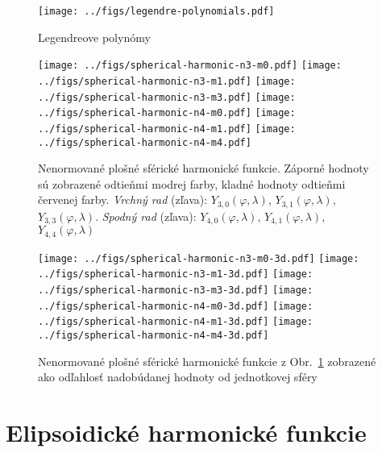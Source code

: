 \documentclass[a4paper, 12pt]{book}
\begin{document}
{

\begin{figure}[bt]
\centering
\texttt{[image: ../figs/legendre-polynomials.pdf]}
\caption{Legendreove polynómy}
\end{figure}




\begin{figure}[bt]
\centering
\texttt{[image: ../figs/spherical-harmonic-n3-m0.pdf]}
\texttt{[image: ../figs/spherical-harmonic-n3-m1.pdf]}
\texttt{[image: ../figs/spherical-harmonic-n3-m3.pdf]}
\texttt{[image: ../figs/spherical-harmonic-n4-m0.pdf]}
\texttt{[image: ../figs/spherical-harmonic-n4-m1.pdf]}
\texttt{[image: ../figs/spherical-harmonic-n4-m4.pdf]}
\caption{Nenormované plošné sférické harmonické funkcie.  Záporné hodnoty sú 
zobrazené odtieňmi modrej farby, kladné hodnoty odtieňmi červenej farby.  
\textit{Vrchný rad} (zľava): $Y_{3,0}(\varphi, \lambda)$, $Y_{3,1}(\varphi, 
\lambda)$, $Y_{3,3}(\varphi, \lambda)$.  \textit{Spodný rad} (zľava): 
$Y_{4,0}(\varphi, \lambda)$, $Y_{4,1}(\varphi, \lambda)$, $Y_{4,4}(\varphi, 
\lambda)$}
\label{fig:sh}
\end{figure}


\begin{figure}[bt]
\centering
\texttt{[image: ../figs/spherical-harmonic-n3-m0-3d.pdf]}
\texttt{[image: ../figs/spherical-harmonic-n3-m1-3d.pdf]}
\texttt{[image: ../figs/spherical-harmonic-n3-m3-3d.pdf]}
\texttt{[image: ../figs/spherical-harmonic-n4-m0-3d.pdf]}
\texttt{[image: ../figs/spherical-harmonic-n4-m1-3d.pdf]}
\texttt{[image: ../figs/spherical-harmonic-n4-m4-3d.pdf]}
\caption{Nenormované plošné sférické harmonické funkcie z Obr.~\ref{fig:sh} 
zobrazené ako odľahlosť nadobúdanej hodnoty od jednotkovej sféry}
\label{fig:sh3d}
\end{figure}






\section{Elipsoidické harmonické funkcie}

}
\end{document}
